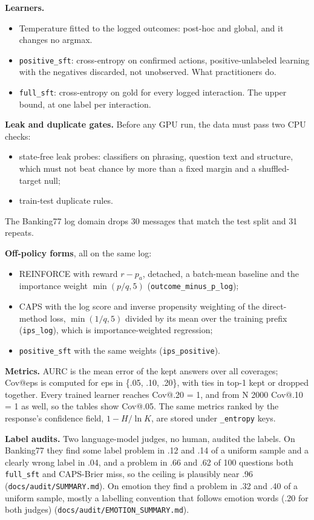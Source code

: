 \documentclass[10pt,letterpaper]{article}
\theoremstyle{plain}
\begin{document}
\textbf{Learners.}
\begin{itemize}
  \item Temperature fitted to the logged outcomes: post-hoc and global, and it changes no argmax.
  \item \texttt{positive\_sft}: cross-entropy on confirmed actions, positive-unlabeled learning with the negatives discarded, not unobserved. What practitioners do.
  \item \texttt{full\_sft}: cross-entropy on gold for every logged interaction. The upper bound, at one label per interaction.
\end{itemize}

\textbf{Leak and duplicate gates.} Before any GPU run, the data must pass two CPU checks:
\begin{itemize}
  \item state-free leak probes: classifiers on phrasing, question text and structure, which must not beat chance by more than a fixed margin and a shuffled-target null;
  \item train-test duplicate rules.
\end{itemize}

The Banking77 log domain drops 30 messages that match the test split and 31 repeats.

\textbf{Off-policy forms}, all on the same log:
\begin{itemize}
  \item REINFORCE with reward $r - p_a$, detached, a batch-mean baseline and the importance weight $\min(p/q, 5)$ (\texttt{outcome\_minus\_p\_log});
  \item CAPS with the log score and inverse propensity weighting of the direct-method loss, $\min(1/q, 5)$ divided by its mean over the training prefix (\texttt{ips\_log}), which is importance-weighted regression;
  \item \texttt{positive\_sft} with the same weights (\texttt{ips\_positive}).
\end{itemize}

\textbf{Metrics.} AURC is the mean error of the kept answers over all coverages; Cov@eps is computed for eps in \{.05, .10, .20\}, with ties in top-1 kept or dropped together. Every trained learner reaches Cov@.20 = 1, and from N 2000 Cov@.10 = 1 as well, so the tables show Cov@.05. The same metrics ranked by the response's confidence field, $1 - H/\ln K$, are stored under \texttt{\_entropy} keys.

\textbf{Label audits.} Two language-model judges, no human, audited the labels. On Banking77 they find some label problem in .12 and .14 of a uniform sample and a clearly wrong label in .04, and a problem in .66 and .62 of 100 questions both \texttt{full\_sft} and CAPS-Brier miss, so the ceiling is plausibly near .96 (\texttt{docs/audit/SUMMARY.md}). On emotion they find a problem in .32 and .40 of a uniform sample, mostly a labelling convention that follows emotion words (.20 for both judges) (\texttt{docs/audit/EMOTION\_SUMMARY.md}).
\end{document}
